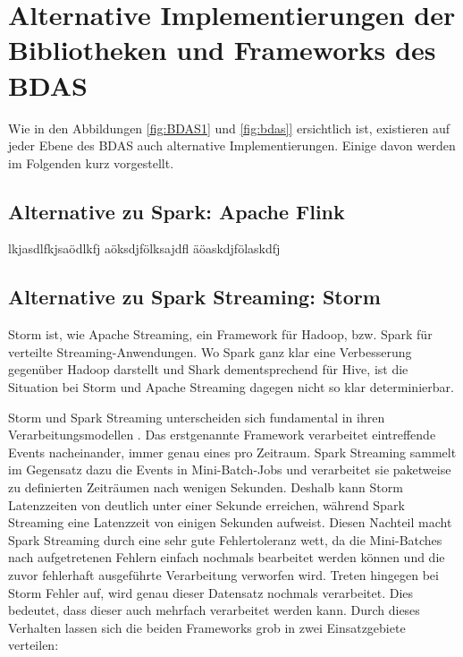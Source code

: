 \chapter{Alternative Implementierungen der Bibliotheken und Frameworks des BDAS}
\label{chapter:alternative implementierungen}








Wie in den Abbildungen \ref{fig:BDAS1} und \ref{fig:bdas]} ersichtlich ist, existieren auf jeder Ebene des BDAS auch alternative Implementierungen. Einige davon werden im Folgenden kurz vorgestellt. 


\section{Alternative zu Spark: Apache Flink}
\label{section:apache flink}

lkjasdlfkjsaödlkfj
aöksdjfölksajdfl
äöaskdjfölaskdfj



\section{Alternative zu Spark Streaming: Storm}
\label{section:storm}


Storm ist, wie Apache Streaming, ein Framework für Hadoop, bzw. Spark für verteilte Streaming-Anwendungen. Wo Spark ganz klar eine Verbesserung gegenüber Hadoop darstellt und Shark dementsprechend für Hive, ist die Situation bei Storm und Apache Streaming dagegen nicht so klar determinierbar. 

Storm und Spark Streaming unterscheiden sich fundamental in ihren Verarbeitungsmodellen . Das erstgenannte Framework verarbeitet eintreffende Events nacheinander, immer genau eines pro Zeitraum. Spark Streaming sammelt im Gegensatz dazu die Events in Mini-Batch-Jobs und verarbeitet sie paketweise zu definierten Zeiträumen nach wenigen Sekunden. Deshalb kann Storm Latenzzeiten von deutlich unter einer Sekunde erreichen, während Spark Streaming eine Latenzzeit von einigen Sekunden aufweist. Diesen Nachteil macht Spark Streaming durch eine sehr gute Fehlertoleranz wett, da die Mini-Batches nach aufgetretenen Fehlern einfach nochmals bearbeitet werden können und die zuvor fehlerhaft ausgeführte Verarbeitung verworfen wird. Treten hingegen bei Storm Fehler auf, wird genau dieser Datensatz nochmals verarbeitet. Dies bedeutet, dass dieser auch mehrfach verarbeitet werden kann. Durch dieses Verhalten lassen sich die beiden Frameworks grob in zwei Einsatzgebiete verteilen:

